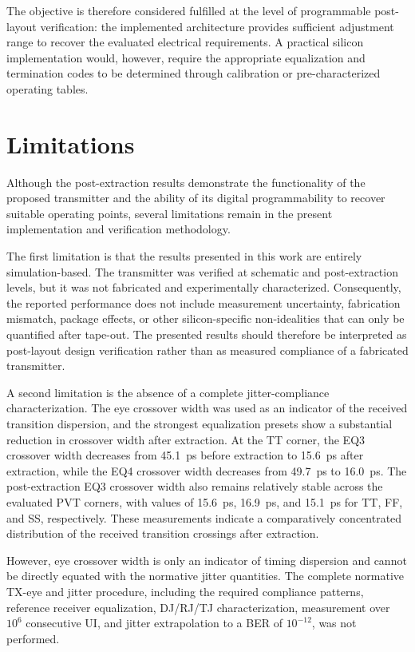 The objective is therefore considered fulfilled at the level of programmable post-layout verification: the implemented architecture provides sufficient adjustment range to recover the evaluated electrical requirements. A practical silicon implementation would, however, require the appropriate equalization and termination codes to be determined through calibration or pre-characterized operating tables.

\section{Limitations}

Although the post-extraction results demonstrate the functionality of the proposed transmitter and the ability of its digital programmability to recover suitable operating points, several limitations remain in the present implementation and verification methodology.

The first limitation is that the results presented in this work are entirely simulation-based. The transmitter was verified at schematic and post-extraction levels, but it was not fabricated and experimentally characterized. Consequently, the reported performance does not include measurement uncertainty, fabrication mismatch, package effects, or other silicon-specific non-idealities that can only be quantified after tape-out. The presented results should therefore be interpreted as post-layout design verification rather than as measured compliance of a fabricated transmitter.

A second limitation is the absence of a complete jitter-compliance characterization. The eye crossover width was used as an indicator of the received transition dispersion, and the strongest equalization presets show a substantial reduction in crossover width after extraction. At the \ac{TT} corner, the EQ3 crossover width decreases from \SI{45.1}{\pico\second} before extraction to \SI{15.6}{\pico\second} after extraction, while the EQ4 crossover width decreases from \SI{49.7}{\pico\second} to \SI{16.0}{\pico\second}. The post-extraction EQ3 crossover width also remains relatively stable across the evaluated \ac{PVT} corners, with values of \SI{15.6}{\pico\second}, \SI{16.9}{\pico\second}, and \SI{15.1}{\pico\second} for \ac{TT}, \ac{FF}, and \ac{SS}, respectively. These measurements indicate a comparatively concentrated distribution of the received transition crossings after extraction. 

However, eye crossover width is only an indicator of timing dispersion and cannot be directly equated with the normative jitter quantities. The complete normative \ac{TX}-eye and jitter procedure, including the required compliance patterns, reference receiver equalization, \ac{DJ}/\ac{RJ}/\ac{TJ} characterization, measurement over $10^6$ consecutive \ac{UI}, and jitter extrapolation to a \ac{BER} of $10^{-12}$, was not performed.

